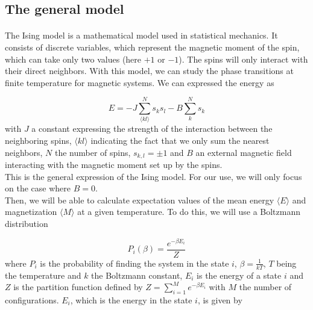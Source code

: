 \documentclass[a4paper, twoside, 11pt]{report}
\theoremstyle{theorem}
\theoremstyle{remark}
\theoremstyle{exemple}
\begin{document}
        \subsection{The general model}
        
            \paragraph{}The Ising model is a mathematical model used in statistical mechanics. It consists of discrete variables, which represent the magnetic moment of the spin, which can take only two values (here $+1$ or $-1$). The spins will only interact with their direct neighbors. With this model, we can study the phase transitions at finite temperature for magnetic systems. We can expressed the energy as 
                
                \begin{equation*}
                    E = -J \sum\limits_{\langle  kl\rangle}^{N}s_ks_l - B \sum\limits_{k}^{N}s_k
                    \tag{1}
                \end{equation*}
            with $J$ a constant expressing the strength of the interaction between the neighboring spins, $\langle kl \rangle$ indicating the fact that we only sum the nearest neighbors, $N$ the number of spins, $s_{k,l} = \pm 1$ and $B$ an external magnetic field interacting with the magnetic moment set up by the spins. \\
            
            This is the general expression of the Ising model. For our use, we will only focus on the case where $B=0$. \\
            Then, we will be able to calculate expectation values of the mean energy $\langle E \rangle$ and magnetization $\langle M \rangle$ at a given temperature. To do this, we will use a Boltzmann distribution
            
                \begin{equation*}
                    P_i(\beta) = \frac{e^{-\beta E_i}}{Z}
                    \tag{2}
                \end{equation*}
            where $P_i$ is the probability of finding the system in the state $i$, $\beta = \frac{1}{kT}$, $T$ being the temperature and $k$ the Boltzmann constant, $E_i$ is the energy of a state $i$ and $Z$ is the partition function defined by $\displaystyle Z = \sum\limits_{i=1}^{M}e^{-\beta E_i}$ with $M$ the number of configurations. $E_i$, which is the energy in the state $i$, is given by 
            
\end{document}
